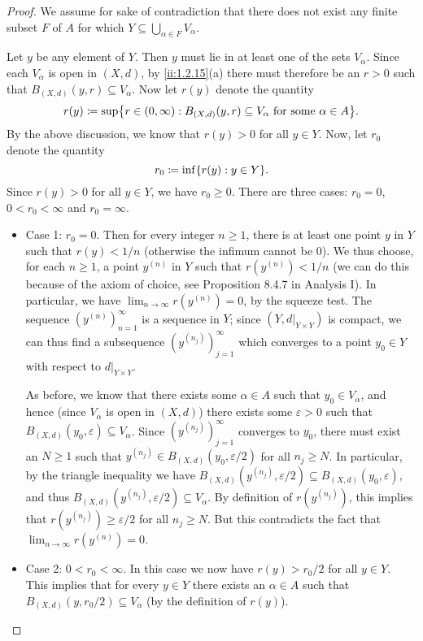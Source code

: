 \begin{proof}
  We assume for sake of contradiction that there does not exist any finite subset \(F\) of \(A\) for which \(Y \subseteq \bigcup_{\alpha \in F} V_{\alpha}\).

  Let \(y\) be any element of \(Y\).
  Then \(y\) must lie in at least one of the sets \(V_{\alpha}\).
  Since each \(V_{\alpha}\) is open in \((X, d)\), by \cref{ii:1.2.15}(a) there must therefore be an \(r > 0\) such that \(B_{(X, d)}(y, r) \subseteq V_{\alpha}\).
  Now let \(r(y)\) denote the quantity
  \[
    r(y) \coloneqq \sup\set{r \in (0, \infty) : B_{(X, d)}(y, r) \subseteq V_{\alpha} \text{ for some } \alpha \in A}.
  \]
  By the above discussion, we know that \(r(y) > 0\) for all \(y \in Y\).
  Now, let \(r_0\) denote the quantity
  \[
    r_0 \coloneqq \inf\set{r(y) : y \in Y}.
  \]
  Since \(r(y) > 0\) for all \(y \in Y\), we have \(r_0 \geq 0\).
  There are three cases: \(r_0 = 0\), \(0 < r_0 < \infty\) and \(r_0 = \infty\).
  \begin{itemize}
    \item Case 1:
          \(r_0 = 0\).
          Then for every integer \(n \geq 1\), there is at least one point \(y\) in \(Y\) such that \(r(y) < 1 / n\) (otherwise the infimum cannot be \(0\)).
          We thus choose, for each \(n \geq 1\), a point \(y^{(n)}\) in \(Y\) such that \(r(y^{(n)}) < 1 / n\)
          (we can do this because of the axiom of choice, see Proposition 8.4.7 in Analysis I).
          In particular, we have \(\lim_{n \to \infty} r(y^{(n)}) = 0\), by the squeeze test.
          The sequence \((y^{(n)})_{n = 1}^\infty\) is a sequence in \(Y\);
          since \((Y, d|_{Y \times Y})\) is compact, we can thus find a subsequence \((y^{(n_j)})_{j = 1}^\infty\) which converges to a point \(y_0 \in Y\) with respect to \(d|_{Y \times Y}\).

          As before, we know that there exists some \(\alpha \in A\) such that \(y_0 \in V_{\alpha}\), and hence (since \(V_{\alpha}\) is open in \((X, d)\)) there exists some \(\varepsilon > 0\) such that \(B_{(X, d)}(y_0, \varepsilon) \subseteq V_{\alpha}\).
          Since \((y^{(n_j)})_{j = 1}^\infty\) converges to \(y_0\), there must exist an \(N \geq 1\) such that \(y^{(n_j)} \in B_{(X, d)}(y_0, \varepsilon / 2)\) for all \(n_j \geq N\).
          In particular, by the triangle inequality we have \(B_{(X, d)}(y^{(n_j)}, \varepsilon / 2) \subseteq B_{(X, d)}(y_0, \varepsilon)\), and thus \(B_{(X, d)}(y^{(n_j)}, \varepsilon / 2) \subseteq V_{\alpha}\).
          By definition of \(r(y^{(n_j)})\), this implies that \(r(y^{(n_j)}) \geq \varepsilon / 2\) for all \(n_j \geq N\).
          But this contradicts the fact that \(\lim_{n \to \infty} r(y^{(n)}) = 0\).
    \item Case 2:
          \(0 < r_0 < \infty\).
          In this case we now have \(r(y) > r_0 / 2\) for all \(y \in Y\).
          This implies that for every \(y \in Y\) there exists an \(\alpha \in A\) such that \(B_{(X, d)}(y, r_0 / 2) \subseteq V_{\alpha}\) (by the definition of \(r(y)\)).


\end{itemize}
\end{proof}
